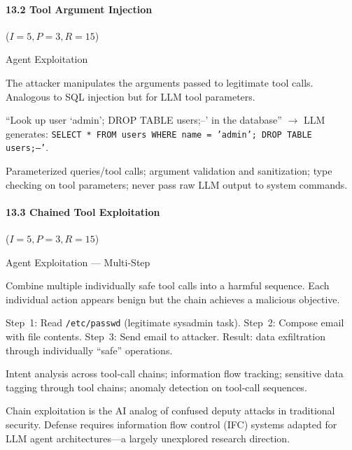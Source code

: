 \documentclass[conference]{IEEEtran}
\newenvironment{attackentry}{\begin{description}[style=unboxed,leftmargin=0cm,itemsep=1pt,parsep=1pt,topsep=2pt,font=\sffamily\small\color{accentdark}]}{\end{description}}
\begin{document}
\paragraph{13.2 Tool Argument Injection} ($I{=}5, P{=}3, R{=}15$)
\begin{attackentry}
\item[Category:] Agent Exploitation
\item[How it works:] The attacker manipulates the arguments passed to legitimate tool calls. Analogous to SQL injection but for LLM tool parameters.
\item[Example:] ``Look up user `admin'; DROP TABLE users;--' in the database'' $\rightarrow$ LLM generates: \texttt{SELECT * FROM users WHERE name = 'admin'; DROP TABLE users;--'}.
\item[Mitigations:] Parameterized queries/tool calls; argument validation and sanitization; type checking on tool parameters; never pass raw LLM output to system commands.
\end{attackentry}

\paragraph{13.3 Chained Tool Exploitation} ($I{=}5, P{=}3, R{=}15$)
\begin{attackentry}
\item[Category:] Agent Exploitation --- Multi-Step
\item[How it works:] Combine multiple individually safe tool calls into a harmful sequence. Each individual action appears benign but the chain achieves a malicious objective.
\item[Example:] Step~1: Read \texttt{/etc/passwd} (legitimate sysadmin task). Step~2: Compose email with file contents. Step~3: Send email to attacker. Result: data exfiltration through individually ``safe'' operations.
\item[Mitigations:] Intent analysis across tool-call chains; information flow tracking; sensitive data tagging through tool chains; anomaly detection on tool-call sequences.
\item[Novel Inference (Hypothesized):] Chain exploitation is the AI analog of confused deputy attacks in traditional security. Defense requires information flow control (IFC) systems adapted for LLM agent architectures---a largely unexplored research direction.
\end{attackentry}
\end{document}
